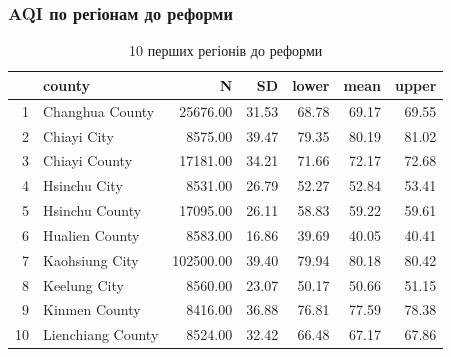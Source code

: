 \documentclass{beamer}
\begin{document}
\begin{frame}
  \frametitle{AQI по регіонам до реформи}

  \begin{table}[ht]
    \centering
    \begin{tabular}{rlrrrrr}
      \hline
      & county & N & SD & lower & mean & upper \\ 
      \hline
    1 & Changhua County & 25676.00 & 31.53 & 68.78 & 69.17 & 69.55 \\ 
      2 & Chiayi City & 8575.00 & 39.47 & 79.35 & 80.19 & 81.02 \\ 
      3 & Chiayi County & 17181.00 & 34.21 & 71.66 & 72.17 & 72.68 \\ 
      4 & Hsinchu City & 8531.00 & 26.79 & 52.27 & 52.84 & 53.41 \\ 
      5 & Hsinchu County & 17095.00 & 26.11 & 58.83 & 59.22 & 59.61 \\ 
      6 & Hualien County & 8583.00 & 16.86 & 39.69 & 40.05 & 40.41 \\ 
      7 & Kaohsiung City & 102500.00 & 39.40 & 79.94 & 80.18 & 80.42 \\ 
      8 & Keelung City & 8560.00 & 23.07 & 50.17 & 50.66 & 51.15 \\ 
      9 & Kinmen County & 8416.00 & 36.88 & 76.81 & 77.59 & 78.38 \\ 
      10 & Lienchiang County & 8524.00 & 32.42 & 66.48 & 67.17 & 67.86 \\ 

        \hline
    \end{tabular}
    \caption{10 перших регіонів до реформи} 
    \end{table}
      
\end{frame}
\end{document}
